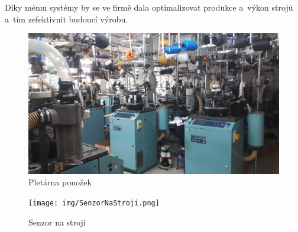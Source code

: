 Díky mému systémy by se ve firmě dala optimalizovat produkce a~výkon strojů a~tím zefektivnit budoucí výrobu. 

\begin{figure}[htbp]
    \centering
    \includegraphics[width=\textwidth]{img/Pletarna.png}
    \caption{Pletárna ponožek}
    \label{fig:databaze}
\end{figure}

\begin{figure}[htbp]
    \centering
    \texttt{[image: img/SenzorNaStroji.png]}
    \caption{Senzor na stroji}
    \label{fig:SenzorNaStroji}
\end{figure}

\newpage